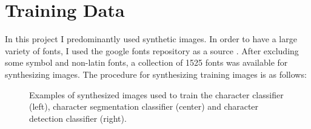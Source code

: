 \documentclass[11pt]{article}
\begin{document}
\section{Training Data}
In this project I predominantly used synthetic images. In order to have a large variety of fonts,
I used the google fonts repository as a source \cite{googlefo53:online}. After excluding some
symbol and non-latin fonts, a collection of 1525 fonts was available for synthesizing images.
The procedure for synthesizing training images is as follows:
\begin{figure}[ht!]
  \centering
  \caption
  {
    Examples of synthesized images used to train the character classifier (left), character segmentation
    classifier (center) and character detection classifier (right).
  }
  \label{fig:training_images}
\end{figure}
\end{document}
